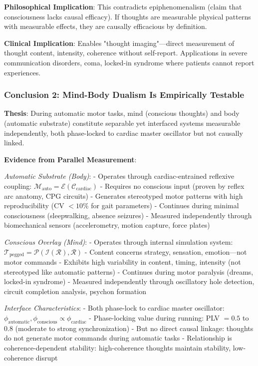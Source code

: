 \documentclass[11pt,onecolumn]{article}
\begin{document}
\textbf{Philosophical Implication}: This contradicts epiphenomenalism (claim that consciousness lacks causal efficacy). If thoughts are measurable physical patterns with measurable effects, they are causally efficacious by definition.

\textbf{Clinical Implication}: Enables "thought imaging"---direct measurement of thought content, intensity, coherence without self-report. Applications in severe communication disorders, coma, locked-in syndrome where patients cannot report experiences.

\subsubsection{Conclusion 2: Mind-Body Dualism Is Empirically Testable}

\textbf{Thesis}: During automatic motor tasks, mind (conscious thoughts) and body (automatic substrate) constitute separable yet interfaced systems measurable independently, both phase-locked to cardiac master oscillator but not causally linked.

\textbf{Evidence from Parallel Measurement}:

\textit{Automatic Substrate (Body)}:
- Operates through cardiac-entrained reflexive coupling: $\mathcal{M}_{\text{auto}} = \mathcal{E}(\mathcal{C}_{\text{cardiac}})$
- Requires no conscious input (proven by reflex arc anatomy, CPG circuits)
- Generates stereotyped motor patterns with high reproducibility (CV $< 10\%$ for gait parameters)
- Continues during minimal consciousness (sleepwalking, absence seizures)
- Measured independently through biomechanical sensors (accelerometry, motion capture, force plates)

\textit{Conscious Overlay (Mind)}:
- Operates through internal simulation system: $\mathcal{T}_{\text{pegged}} = \mathcal{P}(\mathcal{I}(\mathcal{R}), \mathcal{R})$
- Content concerns strategy, sensation, emotion---not motor commands
- Exhibits high variability in content, timing, intensity (not stereotyped like automatic patterns)
- Continues during motor paralysis (dreams, locked-in syndrome)
- Measured independently through oscillatory hole detection, circuit completion analysis, psychon formation

\textit{Interface Characteristics}:
- Both phase-lock to cardiac master oscillator: $\phi_{\text{automatic}}, \phi_{\text{conscious}} \propto \phi_{\text{cardiac}}$
- Phase-locking value during running: PLV $= 0.5$ to $0.8$ (moderate to strong synchronization)
- But no direct causal linkage: thoughts do not generate motor commands during automatic tasks
- Relationship is coherence-dependent stability: high-coherence thoughts maintain stability, low-coherence disrupt
\end{document}
